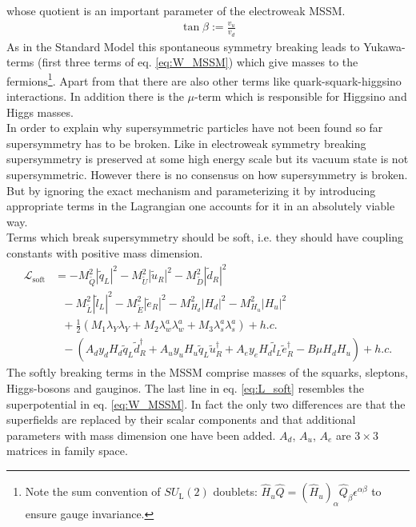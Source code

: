 whose quotient is an important parameter of the electroweak MSSM.
\begin{align}
\tan \beta := \frac{v_u}{v_d}
\end{align}
As in the Standard Model this spontaneous symmetry breaking leads to Yukawa-terms (first three terms of eq. \ref{eq:W_MSSM}) which give masses to the fermions\footnote{Note the sum convention of $SU_{\mathrm{L}}(2)$ doublets: $\hat{H}_u \hat{Q} =  (\hat{H}_u)_{\alpha}\hat{Q}_\beta \epsilon^{\alpha\beta}$ to ensure gauge invariance.}. Apart from that there are also other terms like quark-squark-higgsino interactions. In addition there is the $\mu$-term which is responsible for Higgsino and Higgs masses.\\
In order to explain why supersymmetric particles have not been found so far supersymmetry has to be broken. Like in electroweak symmetry breaking supersymmetry is preserved at some high energy scale but its vacuum state is not supersymmetric. However there is no consensus on how supersymmetry is broken. But by ignoring the exact mechanism and parameterizing it by introducing appropriate terms in the Lagrangian one accounts for it in an absolutely viable way.\\
Terms which break supersymmetry should be soft, i.e. they should have coupling constants with positive mass dimension.
\begin{align}
\mathcal{L}_{\mathrm{soft}} &= -M^2_{\tilde{Q}}|\tilde{q}_L|^2 - M^2_{\tilde{U}}|\tilde{u}_R|^2 - M^2_{\tilde{D}}|\tilde{d}_R|^2 \nonumber\\
&\ \ \ - M^2_{\tilde{L}}|\tilde{l}_L|^2 - M^2_{\tilde{E}}|\tilde{e}_R|^2 - M^2_{H_d}|H_d|^2 - M^2_{H_u}|H_u|^2\nonumber\\
&\ \ \ +\frac{1}{2}\left( M_1 \lambda_Y\lambda_Y + M_2 \lambda_w^a\lambda_w^a + M_3 \lambda_s^a\lambda_s^a\right) + h.c.\nonumber\\
&\ \ \ -\left( A_d y_d H_d \tilde{q}_L \tilde{d}^\dagger_R + A_u y_u H_u \tilde{q}_L \tilde{u}^\dagger_R + A_e y_e H_d \tilde{l}_L \tilde{e}^\dagger_R -B\mu H_d H_u \right) + h.c.\label{eq:L_soft}
\end{align}
The softly breaking terms in the MSSM comprise masses of the squarks, sleptons, Higgs-bosons and gauginos. The last line in eq. \ref{eq:L_soft} resembles the superpotential in eq. \ref{eq:W_MSSM}. In fact the only two differences are that the superfields are replaced by their scalar components and that additional parameters with mass dimension one have been added. $A_d$, $A_u$, $A_e$ are $3 \times 3$ matrices in family space.\\
